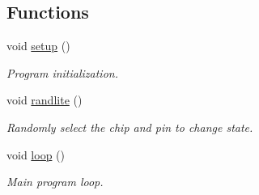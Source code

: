 \subsection*{Functions}
\begin{DoxyCompactItemize}
\item 
void \hyperlink{SN74__RandomBlink_8ino_a4fc01d736fe50cf5b977f755b675f11d}{setup} ()
\begin{DoxyCompactList}\small\item\em Program initialization. \end{DoxyCompactList}\item 
void \hyperlink{SN74__RandomBlink_8ino_a9069fa50959f53362dad0f5038f45d60}{randlite} ()
\begin{DoxyCompactList}\small\item\em Randomly select the chip and pin to change state. \end{DoxyCompactList}\item 
void \hyperlink{SN74__RandomBlink_8ino_afe461d27b9c48d5921c00d521181f12f}{loop} ()
\begin{DoxyCompactList}\small\item\em Main program loop. \end{DoxyCompactList}\end{DoxyCompactItemize}
